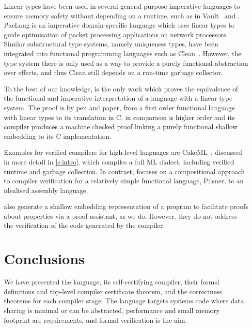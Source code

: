 \documentclass[9pt\ifFinal\else,preprint,nocopyrightspace\fi,\ifAlpha\else natbib,authoryear\fi]{sigplanconf}
\begin{document}
\begin{figure*}[t]
\begin{center}
\begin{inductive0}
Linear types have been used in several general purpose imperative languages
to ensure memory safety without depending on a runtime, such as in Vault~\citep{Fahndrich_DeLine_02} and \citet{Rust:lang}.
PacLang \citep{Ennals_SM_04} is an imperative domain-specific language which uses linear
types to guide optimisation of packet processing applications on network
processors. Similar substructural type systems, namely uniqueness types, have been
integrated into functional programming languages such as
Clean~\citep{Barendsen_Smeters_93}. However, the type system there is only
used as a way to provide a purely functional abstraction over effects, 
and thus Clean still depends on a run-time garbage collector.



To the best of our knowledge, \citet{Hofmann_00} is the only work which proves the equivalence of the functional and imperative interpretation of a language with a linear type
system. The proof is by pen and paper, from a first order functional language with linear types to its translation in C. \CDSL in comparison is higher order and its compiler
produces a machine checked proof linking a purely functional shallow embedding
to its C implementation.



Examples for verified compilers for high-level languages are
CakeML~\citep{Kumar_MNO_14}, discussed in more detail in \autoref{s:intro}, which compiles a full ML dialect, including verified runtime and garbage
collection. In contrast, \citep{Neis_HKMDV_15} focuses on a compositional approach to
compiler verification for a relatively simple functional language, Pilsner,
to an idealised assembly language.

\citet{Chargueraud_10, Chargueraud_11} also generate a shallow
embedding representation of a program to facilitate proofs about
properties via a proof assistant, as we do. However, they do not address the
verification of the code generated by the compiler.

\section{Conclusions}\label{s:concl}

We have presented the \cdsl language, its self-certifying compiler, their
formal definitions and top-level compiler certificate theorem,
and the correctness theorems for each compiler stage. The
language targets systems code where data sharing is minimal or can be abstracted,
performance and small memory footprint are requirements, and formal
verification is the aim.


\end{inductive0}
\end{center}
\end{figure*}
\end{document}

